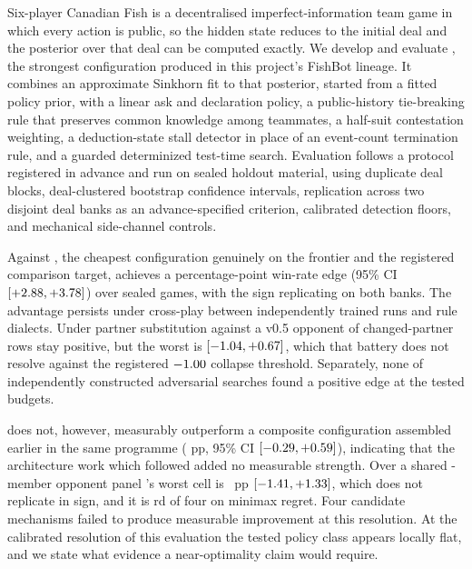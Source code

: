 Six-player Canadian Fish is a decentralised imperfect-information team game in which every action is
public, so the hidden state reduces to the initial deal and the posterior over that deal can be
computed exactly. We develop and evaluate \sestina{}, the strongest configuration produced in this
project's FishBot lineage. It combines an approximate Sinkhorn fit to that posterior, started from a fitted
policy prior, with a linear ask and declaration policy, a public-history tie-breaking rule that preserves
common knowledge among teammates, a half-suit contestation weighting, a
deduction-state stall detector in place of an event-count termination rule, and a guarded
determinized test-time search. Evaluation follows a protocol registered in advance and run on sealed
holdout material, using duplicate deal blocks, deal-clustered bootstrap confidence intervals,
replication across two disjoint deal banks as an advance-specified criterion, calibrated detection
floors, and mechanical side-channel controls.

Against \fcheap{}, the cheapest configuration genuinely on the \vsix{} frontier and the registered
comparison target, \sestina{} achieves a \vsevenBtwoFcheap{} percentage-point win-rate edge
(95\% CI $[+2.88, +3.78]$) over \vsevenBtwoFcheapN{} sealed games, with
the sign replicating on both banks. The advantage persists under cross-play between independently trained runs and
\vsevenDiaRowsWord{} rule dialects. Under partner substitution against a v0.5 opponent
\vsevenSonePositive{} of \vsevenSoneRows{} changed-partner rows stay positive, but the worst is \vsevenSoneMin{}
$[-1.04, +0.67]$, which that battery does not resolve
against the registered $-1.00{}$ collapse threshold. Separately, none of
\vsevenBfourArmsWord{} independently constructed adversarial searches found a positive edge at the
tested budgets.

\sestina{} does not, however, measurably outperform a composite configuration assembled earlier in
the same programme (\vsevenBtwoComposite{} pp, 95\% CI
$[-0.29, +0.59]$), indicating that the architecture work which
followed added no measurable strength. Over a shared \vsevenPanelMembers{}-member opponent panel
\sestina{}'s worst cell is \vsevenWorstFrozen{}~pp
$[-1.41, +1.33]$, which does not replicate in sign, and it is
\vsevenRegretFrozenRank{}rd of four on minimax regret. Four candidate mechanisms failed to produce
measurable improvement at this resolution. At the calibrated resolution of this evaluation the tested policy
class appears locally flat, and we state what evidence a near-optimality claim would require.

